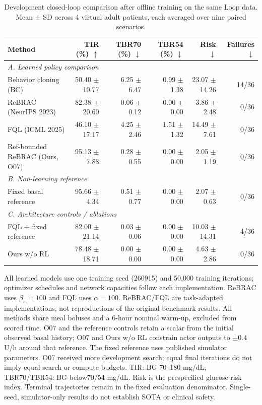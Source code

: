 \begin{table}[t]
\centering
\footnotesize
\caption{Development closed-loop comparison after offline training on the same Loop data. Mean $\pm$ SD across 4 virtual adult patients, each averaged over nine paired scenarios.}
\label{tab:rl-dev}
\begin{tabular*}{\textwidth}{@{\extracolsep{\fill}}lrrrrr@{}}
\toprule
Method & TIR (\%) $\uparrow$ & TBR70 (\%) $\downarrow$ & TBR54 (\%) $\downarrow$ & Risk $\downarrow$ & Failures $\downarrow$ \\
\midrule
\multicolumn{6}{l}{\textit{A. Learned policy comparison}} \\
Behavior cloning (BC) & 50.40 $\pm$ 10.77 & 6.25 $\pm$ 6.47 & 0.99 $\pm$ 1.38 & 23.07 $\pm$ 14.26 & 14/36 \\
ReBRAC (NeurIPS 2023) & 82.38 $\pm$ 20.60 & 0.06 $\pm$ 0.12 & 0.00 $\pm$ 0.00 & 3.86 $\pm$ 2.48 & 0/36 \\
FQL (ICML 2025) & 46.10 $\pm$ 17.17 & 4.25 $\pm$ 2.46 & 1.51 $\pm$ 1.32 & 14.49 $\pm$ 7.61 & 0/36 \\
Ref-bounded ReBRAC (Ours, O07) & 95.13 $\pm$ 7.88 & 0.28 $\pm$ 0.55 & 0.00 $\pm$ 0.00 & 2.05 $\pm$ 1.19 & 0/36 \\
\midrule
\multicolumn{6}{l}{\textit{B. Non-learning reference}} \\
Fixed basal reference & 95.66 $\pm$ 4.34 & 0.51 $\pm$ 0.77 & 0.00 $\pm$ 0.00 & 2.07 $\pm$ 0.63 & 0/36 \\
\midrule
\multicolumn{6}{l}{\textit{C. Architecture controls / ablations}} \\
FQL + fixed reference & 82.00 $\pm$ 21.14 & 0.03 $\pm$ 0.06 & 0.00 $\pm$ 0.00 & 10.03 $\pm$ 14.31 & 4/36 \\
Ours w/o RL & 78.48 $\pm$ 18.71 & 0.00 $\pm$ 0.00 & 0.00 $\pm$ 0.00 & 4.63 $\pm$ 2.86 & 0/36 \\
\bottomrule
\end{tabular*}
\vspace{2pt}
\begin{minipage}{\textwidth}\scriptsize
All learned models use one training seed (260915) and 50,000 training iterations; optimizer schedules and network capacities follow each implementation. ReBRAC uses $\beta_\pi=100$ and FQL uses $\alpha=100$. ReBRAC/FQL are task-adapted implementations, not reproductions of the original benchmark results. All methods share meal boluses and a 6-hour nominal warm-up, excluded from scored time. O07 and the reference controls retain a scalar from the initial observed basal history; O07 and Ours w/o RL constrain actor outputs to $\pm0.4$ U/h around that reference. The fixed reference uses published simulator parameters. O07 received more development search; equal final iterations do not imply equal search or compute budgets. TIR: BG 70--180 mg/dL; TBR70/TBR54: BG below70/54 mg/dL. Risk is the prespecified glucose risk index. Terminal trajectories remain in the fixed evaluation denominator. Single-seed, simulator-only results do not establish SOTA or clinical safety.
\end{minipage}
\end{table}
